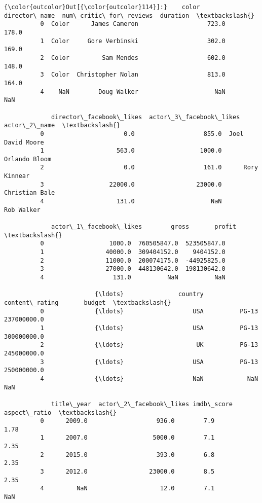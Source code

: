 \documentclass[11pt]{article}
\begin{document}
\begin{Verbatim}[commandchars=\\\{\}]
{\color{outcolor}Out[{\color{outcolor}114}]:}    color      director\_name  num\_critic\_for\_reviews  duration  \textbackslash{}
          0  Color      James Cameron                   723.0     178.0   
          1  Color     Gore Verbinski                   302.0     169.0   
          2  Color         Sam Mendes                   602.0     148.0   
          3  Color  Christopher Nolan                   813.0     164.0   
          4    NaN        Doug Walker                     NaN       NaN   
          
             director\_facebook\_likes  actor\_3\_facebook\_likes      actor\_2\_name  \textbackslash{}
          0                      0.0                   855.0  Joel David Moore   
          1                    563.0                  1000.0     Orlando Bloom   
          2                      0.0                   161.0      Rory Kinnear   
          3                  22000.0                 23000.0    Christian Bale   
          4                    131.0                     NaN        Rob Walker   
          
             actor\_1\_facebook\_likes        gross       profit  \textbackslash{}
          0                  1000.0  760505847.0  523505847.0   
          1                 40000.0  309404152.0    9404152.0   
          2                 11000.0  200074175.0  -44925825.0   
          3                 27000.0  448130642.0  198130642.0   
          4                   131.0          NaN          NaN   
          
                         {\ldots}               country content\_rating       budget  \textbackslash{}
          0              {\ldots}                   USA          PG-13  237000000.0   
          1              {\ldots}                   USA          PG-13  300000000.0   
          2              {\ldots}                    UK          PG-13  245000000.0   
          3              {\ldots}                   USA          PG-13  250000000.0   
          4              {\ldots}                   NaN            NaN          NaN   
          
             title\_year  actor\_2\_facebook\_likes imdb\_score  aspect\_ratio  \textbackslash{}
          0      2009.0                   936.0        7.9          1.78   
          1      2007.0                  5000.0        7.1          2.35   
          2      2015.0                   393.0        6.8          2.35   
          3      2012.0                 23000.0        8.5          2.35   
          4         NaN                    12.0        7.1           NaN   
          

\end{Verbatim}
\end{document}
